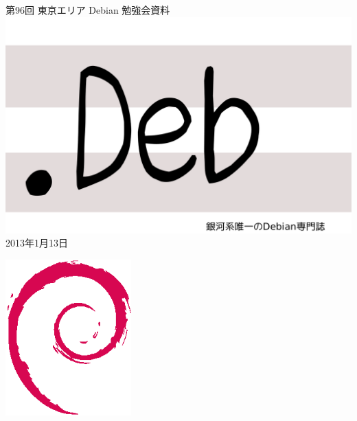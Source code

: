 \documentclass[mingoth,a4paper]{jsarticle}
\newcommand{\debmtgyear}{2013}
\newcommand{\debmtgmonth}{1}
\newcommand{\debmtgdate}{13}
\newcommand{\debmtgnumber}{96}
\begin{document}
\begin{titlepage}
\thispagestyle{empty}

\vspace*{-2cm}
第\debmtgnumber{}回 東京エリア Debian 勉強会資料\\
\hspace*{-2cm}
\includegraphics{image2012-natsu/dotdeb.pdf}\\
\hfill{}\debmtgyear{}年\debmtgmonth{}月\debmtgdate{}日



\vspace*{-2cm}
\hfill{}\includegraphics[height=6cm]{image200502/openlogo-nd.eps}
\end{titlepage}

\end{document}

